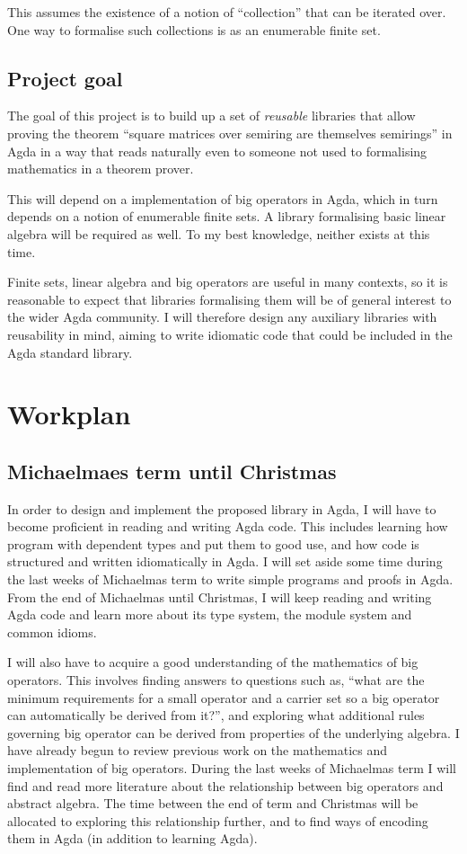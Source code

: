\documentclass[a4paper]{scrartcl}
\begin{document}
This assumes the existence of a notion of \enquote{collection} that can be iterated over. One way to formalise such collections is as an enumerable finite set.

\subsection{Project goal}

The goal of this project is to build up a set of \emph{reusable} libraries that allow proving the theorem \enquote{square matrices over semiring are themselves semirings} in Agda in a way that reads naturally even to someone not used to formalising mathematics in a theorem prover.

This will depend on a implementation of big operators in Agda, which in turn depends on a notion of enumerable finite sets. A library formalising basic linear algebra will be required as well. To my best knowledge, neither exists at this time.

Finite sets, linear algebra and big operators are useful in many contexts, so it is reasonable to expect that libraries formalising them will be of general interest to the wider Agda community. I will therefore design any auxiliary libraries with reusability in mind, aiming to write idiomatic code that could be included in the Agda standard library.

\section{Workplan}
\label{workplan}

\subsection{Michaelmaes term until Christmas}

In order to design and implement the proposed library in Agda, I will have to become proficient in reading and writing Agda code. This includes learning how program with dependent types and put them to good use, and how code is structured and written idiomatically in Agda. I will set aside some time during the last weeks of Michaelmas term to write simple programs and proofs in Agda. From the end of Michaelmas until Christmas, I will keep reading and writing Agda code and learn more about its type system, the module system and common idioms.

I will also have to acquire a good understanding of the mathematics of big operators. This involves finding answers to questions such as, \enquote{what are the minimum requirements for a small operator and a carrier set so a big operator can automatically be derived from it?}, and exploring what additional rules governing big operator can be derived from properties of the underlying algebra. I have already begun to review previous work on the mathematics and implementation of big operators. During the last weeks of Michaelmas term I will find and read more literature about the relationship between big operators and abstract algebra. The time between the end of term and Christmas will be allocated to exploring this relationship further, and to find ways of encoding them in Agda (in addition to learning Agda).
\end{document}
